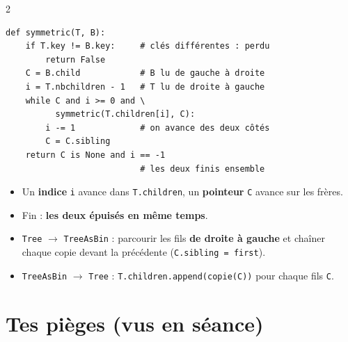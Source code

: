 \documentclass[10pt,a4paper]{article}
\newcommand{\tc}[1]{\textcolor{treec}{\texttt{#1}}}   %
\newcommand{\bc}[1]{\textcolor{tabc}{\texttt{#1}}}    %
\newcommand{\sect}[1]{\section*{\color{theme}#1}}
\begin{document}
\begin{multicols}{2}
\begin{lstlisting}
def symmetric(T, B):
    if T.key != B.key:     # clés différentes : perdu
        return False
    C = B.child            # B lu de gauche à droite
    i = T.nbchildren - 1   # T lu de droite à gauche
    while C and i >= 0 and \
          symmetric(T.children[i], C):
        i -= 1             # on avance des deux côtés
        C = C.sibling
    return C is None and i == -1
                           # les deux finis ensemble
\end{lstlisting}
\columnbreak
\begin{itemize}
\item Un \textbf{indice} \tc{i} avance dans \tc{T.children}, un \textbf{pointeur} \bc{C} avance sur les fr\`eres.
\item Fin : \textbf{les deux \'epuis\'es en m\^eme temps}.
\item \tc{Tree} $\to$ \bc{TreeAsBin} : parcourir les fils \textbf{de droite \`a gauche} et cha\^iner chaque copie devant la pr\'ec\'edente (\bc{C.sibling = first}).
\item \bc{TreeAsBin} $\to$ \tc{Tree} : \tc{T.children.append(copie(C))} pour chaque fils \bc{C}.
\end{itemize}
\end{multicols}

\sect{Tes pi\`eges (vus en s\'eance)}
\end{document}

